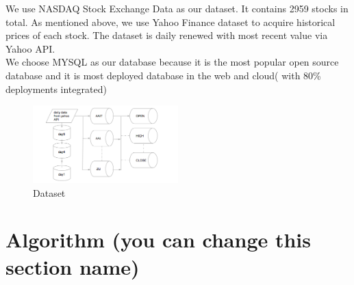 \documentclass[10pt, conference, compsocconf]{IEEEtran}
\begin{document}
\begin{enumerate}[label=\Alph*]
We use NASDAQ Stock Exchange Data as our dataset. It contains 2959 stocks in total. As mentioned above, we use Yahoo Finance dataset to acquire historical prices of each stock. The dataset is daily renewed  with most recent value via Yahoo API.\\
           We choose MYSQL as our database because it is the most popular open source database and it is most deployed database in the web and cloud( with 80\% deployments integrated)
   \begin{figure}[!h]
            \centering
           \includegraphics[width=0.5\textwidth]{figures/dataset.jpg}
           \caption{Dataset}
          \vspace{0.1cm}
    \end{figure}

    
 \end{enumerate}

\section{Algorithm (you can change this section name)} 
\end{document}
